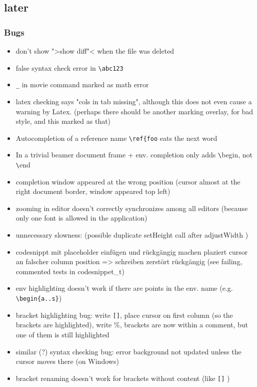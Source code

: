 \documentclass[10pt,a4paper,landscape]{report}
\begin{document}
\subsection{later}

\subsubsection{Bugs}
\begin{itemize}
\item don't show ">show diff"< when the file was deleted
\item false syntax check error in \verb+\abc123+
\item \verb+_+ in movie command marked as math error
\item latex checking says "cols in tab missing", although this does not even cause a warning by Latex. (perhaps there should be another marking overlay, for bad style, and this marked as that)
\item Autocompletion of a reference name \verb+\ref{foo+ eats the next word
\item In a trivial beamer document frame + env. completion only adds \verb+\+begin, not \verb+\+end
\item completion window appeared at the wrong position (cursor almost at the right document border, window appeared top left)
\item zooming in editor doesn't correctly synchronizes among all editors (because only one font is allowed in the application)
\item unnecessary slowness: (possible duplicate setHeight call after adjustWidth )
\item codesnippt mit placeholder einfügen und rückgängig machen plaziert cursor an falscher column position => schreiben zerstört rückgängig (see failing, commented tests in codesnippet\_t)
\item  env highlighting doesn't work if there are points in the env. name (e.g. \verb+\begin{a..s}+)
\item bracket highlighting bug: write \verb+[]+, place cursor on first column (so the brackets are highlighted), write \%, brackets are now within a comment, but one of them is still highlighted
\item similar (?) syntax checking bug: error background not updated unless the cursor moves there (on Windows)
\item bracket renaming doesn't work for brackets without content (like \verb+[]+ )

\end{itemize}
\end{document}
